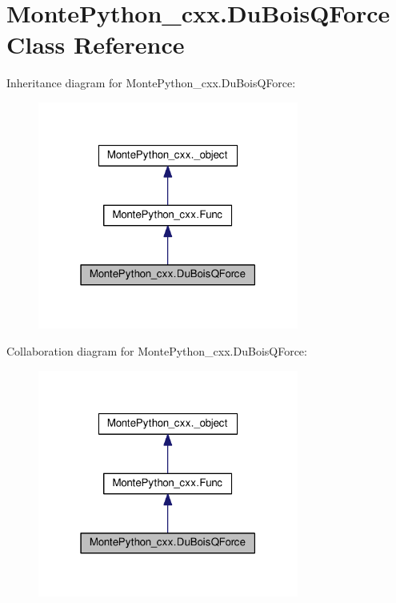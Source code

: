 \hypertarget{classMontePython__cxx_1_1DuBoisQForce}{}\section{Monte\+Python\+\_\+cxx.\+Du\+Bois\+Q\+Force Class Reference}
\label{classMontePython__cxx_1_1DuBoisQForce}


Inheritance diagram for Monte\+Python\+\_\+cxx.\+Du\+Bois\+Q\+Force\+:
\nopagebreak
\begin{figure}[H]
\begin{center}
\leavevmode
\includegraphics[width=243pt]{classMontePython__cxx_1_1DuBoisQForce__inherit__graph}
\end{center}
\end{figure}


Collaboration diagram for Monte\+Python\+\_\+cxx.\+Du\+Bois\+Q\+Force\+:
\nopagebreak
\begin{figure}[H]
\begin{center}
\leavevmode
\includegraphics[width=243pt]{classMontePython__cxx_1_1DuBoisQForce__coll__graph}
\end{center}
\end{figure}
